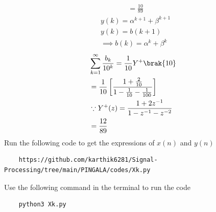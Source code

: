 \documentclass[journal,12pt,twocolumn]{IEEEtran}
\renewcommand\thesection{\arabic{section}}
\begin{document}
\begin{enumerate}[label=\thesection.\arabic*,ref=\thesection.\theenumi]
\begin{align}
	&=\frac{10}{89}
\end{align}
\begin{align}
	&y(k)=\alpha^{k+1}+\beta^{k+1}\\
	&y(k)=b(k+1)\\
	&\implies b(k)=\alpha^{k}+\beta^{k}
\end{align}
\begin{align}
	&\sum_{k=1}^{\infty}\frac{b_k}{10^k} =\frac{1}{10}Y^{+}\brak{{10}}\\
	&=\frac{1}{10}\left[\frac{1+\frac{2}{10}}{1-\frac{1}{10}-\frac{1}{100}}\right]\\
	&\because Y^{+}(z)=\frac{1+2z^{-1}}{1-z^{-1}-z^{-2}}\\
	&=\frac{12}{89}
\end{align}
Run the following code to get the expressions of $x(n)$ and $y(n)$
\begin{lstlisting}
	https://github.com/karthik6281/Signal-Processing/tree/main/PINGALA/codes/Xk.py
\end{lstlisting}
Use the following command in the terminal to run the code
\begin{lstlisting}
	python3 Xk.py
\end{lstlisting}
\end{enumerate}
\end{document}
